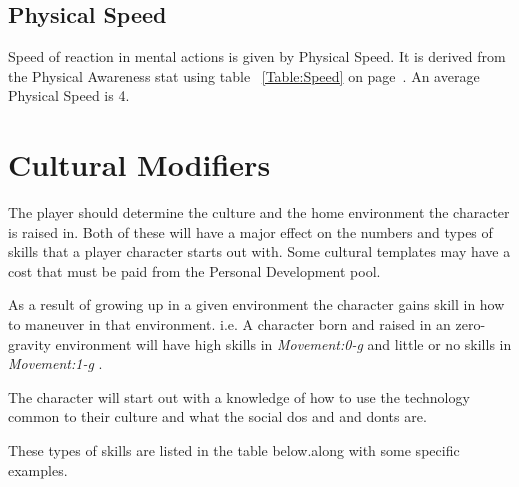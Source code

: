 \subsection{Physical Speed}

Speed of reaction in mental actions is given by 
Physical Speed. It is derived from the
Physical Awareness stat using table ~\ref{Table:Speed} on page~\pageref{Table:Speed}.
An average Physical Speed is 4.



\section{Cultural Modifiers}

The player should determine the culture and the home environment
the character is raised in. Both of these will have a major 
effect on the numbers and types of skills that a player character
starts out with. Some cultural templates may have a cost that must be 
paid from the Personal Development pool.

As a result of growing up in a given environment the character 
gains skill in how to maneuver in that environment. i.e. A character
born and raised in an zero-gravity environment will have high skills
in {\em Movement:0-g } and little or no skills in {\em Movement:1-g }.

The character will start out with a knowledge of how to
use the technology common to their culture and what the social dos and
and donts are.

These types of skills are listed in the table below.along with some
specific examples.

